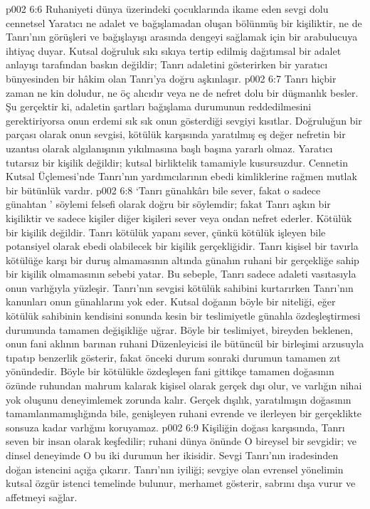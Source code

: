 \vs p002 6:6 Ruhaniyeti dünya üzerindeki çocuklarında ikame eden sevgi dolu cennetsel Yaratıcı ne adalet ve bağışlamadan oluşan bölünmüş bir kişiliktir, ne de Tanrı’nın görüşleri ve bağışlayışı arasında dengeyi sağlamak için bir arabulucuya ihtiyaç duyar. Kutsal doğruluk sıkı sıkıya tertip edilmiş dağıtımsal bir adalet anlayışı tarafından baskın değildir; Tanrı adaletini gösterirken bir yaratıcı bünyesinden bir hâkim olan Tanrı’ya doğru aşkınlaşır.
\vs p002 6:7 Tanrı hiçbir zaman ne kin doludur, ne öç alıcıdır veya ne de nefret dolu bir düşmanlık besler. Şu gerçektir ki, adaletin şartları bağışlama durumunun reddedilmesini gerektiriyorsa onun erdemi sık sık onun gösterdiği sevgiyi kısıtlar. Doğruluğun bir parçası olarak onun sevgisi, kötülük karşısında yaratılmış eş değer nefretin bir uzantısı olarak algılanışının yıkılmasına başlı başına yararlı olmaz. Yaratıcı tutarsız bir kişilik değildir; kutsal birliktelik tamamiyle kusursuzdur. Cennetin Kutsal Üçlemesi’nde Tanrı’nın yardımcılarının ebedi kimliklerine rağmen mutlak bir bütünlük vardır.
\vs p002 6:8 ‘Tanrı günahkârı bile sever, fakat o sadece günahtan ’ söylemi felsefi olarak doğru bir söylemdir; fakat Tanrı aşkın bir kişiliktir ve sadece kişiler diğer kişileri sever veya ondan nefret ederler. Kötülük bir kişilik değildir. Tanrı kötülük yapanı sever, çünkü kötülük işleyen bile potansiyel olarak ebedi olabilecek bir kişilik gerçekliğidir. Tanrı kişisel bir tavırla kötülüğe karşı bir duruş almamasının altında günahın ruhani bir gerçekliğe sahip bir kişilik olmamasının sebebi yatar. Bu sebeple, Tanrı sadece adaleti vasıtasıyla onun varlığıyla yüzleşir. Tanrı’nın sevgisi kötülük sahibini kurtarırken Tanrı’nın kanunları onun günahlarını yok eder. Kutsal doğanın böyle bir niteliği, eğer kötülük sahibinin kendisini sonunda kesin bir teslimiyetle günahla özdeşleştirmesi durumunda tamamen değişikliğe uğrar. Böyle bir teslimiyet, bireyden beklenen, onun fani aklının barınan ruhani Düzenleyicisi ile bütüncül bir birleşimi arzusuyla tıpatıp benzerlik gösterir, fakat önceki durum sonraki durumun tamamen zıt yönündedir. Böyle bir kötülükle özdeşleşen fani gittikçe tamamen doğasının özünde ruhundan mahrum kalarak kişisel olarak gerçek dışı olur, ve varlığın nihai yok oluşunu deneyimlemek zorunda kalır. Gerçek dışılık, yaratılmışın doğasının tamamlanmamışlığında bile, genişleyen ruhani evrende ve ilerleyen bir gerçeklikte sonsuza kadar varlığını koruyamaz.
\vs p002 6:9 Kişiliğin doğası karşısında, Tanrı seven bir insan olarak keşfedilir; ruhani dünya önünde O bireysel bir sevgidir; ve dinsel deneyimde O bu iki durumun her ikisidir. Sevgi Tanrı’nın iradesinden doğan istencini açığa çıkarır. Tanrı’nın iyiliği; sevgiye olan evrensel yönelimin kutsal özgür istenci temelinde bulunur, merhamet gösterir, sabrını dışa vurur ve affetmeyi sağlar.
